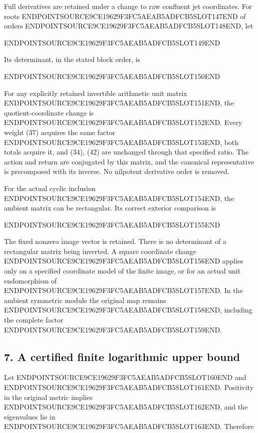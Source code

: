 Full derivatives are retained under a change to raw confluent jet coordinates. For roots ENDPOINTSOURCE9CE19629F3FC5AEAB5ADFCB5SLOT147END of orders ENDPOINTSOURCE9CE19629F3FC5AEAB5ADFCB5SLOT148END, let

ENDPOINTSOURCE9CE19629F3FC5AEAB5ADFCB5SLOT149END

Its determinant, in the stated block order, is

ENDPOINTSOURCE9CE19629F3FC5AEAB5ADFCB5SLOT150END

For any explicitly retained invertible arithmetic unit matrix ENDPOINTSOURCE9CE19629F3FC5AEAB5ADFCB5SLOT151END, the quotient-coordinate change is ENDPOINTSOURCE9CE19629F3FC5AEAB5ADFCB5SLOT152END. Every weight (37) acquires the same factor ENDPOINTSOURCE9CE19629F3FC5AEAB5ADFCB5SLOT153END, both totals acquire it, and (34), (42) are unchanged through that specified ratio. The action and return are conjugated by this matrix, and the canonical representative is precomposed with its inverse. No nilpotent derivative order is removed.

For the actual cyclic inclusion ENDPOINTSOURCE9CE19629F3FC5AEAB5ADFCB5SLOT154END, the ambient matrix can be rectangular. Its correct exterior comparison is

ENDPOINTSOURCE9CE19629F3FC5AEAB5ADFCB5SLOT155END

The fixed nonzero image vector is retained. There is no determinant of a rectangular matrix being inverted. A square coordinate change ENDPOINTSOURCE9CE19629F3FC5AEAB5ADFCB5SLOT156END applies only on a specified coordinate model of the finite image, or for an actual unit endomorphism of ENDPOINTSOURCE9CE19629F3FC5AEAB5ADFCB5SLOT157END. In the ambient symmetric module the original map remains ENDPOINTSOURCE9CE19629F3FC5AEAB5ADFCB5SLOT158END, including the complete factor ENDPOINTSOURCE9CE19629F3FC5AEAB5ADFCB5SLOT159END.

\subsection{7. A certified finite logarithmic upper bound}\label{endpoint-restriction_original--a-certified-finite-logarithmic-upper-bound}

Let ENDPOINTSOURCE9CE19629F3FC5AEAB5ADFCB5SLOT160END and ENDPOINTSOURCE9CE19629F3FC5AEAB5ADFCB5SLOT161END. Positivity in the original metric implies ENDPOINTSOURCE9CE19629F3FC5AEAB5ADFCB5SLOT162END, and the eigenvalues lie in ENDPOINTSOURCE9CE19629F3FC5AEAB5ADFCB5SLOT163END. Therefore


